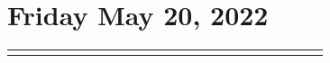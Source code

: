\documentclass[
	openany, %
	parskip=false, %
	12pt, %
	a4paper, %
]{conferencebooklet} %
\begin{document}
\section{Friday May 20, 2022}
\begin{longtable}{|C{0.15\linewidth}| C{0.04\linewidth}|  C{0.3\linewidth} C{0.0\linewidth} C{0.4\linewidth}|}\hline	
\end{longtable}

\newpage

%
%

\end{document}
